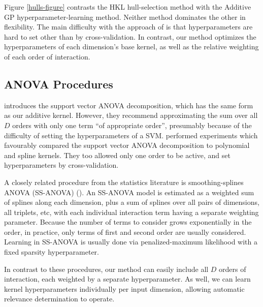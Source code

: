 Figure \ref{hulls-figure} contrasts the HKL hull-selection method with the Additive GP hyperparameter-learning method. Neither method dominates the other in flexibility.  The main difficulty with the approach of \cite{DBLP:journals/corr/abs-0909-0844} is that hyperparameters are hard to set other than by cross-validation.  In contrast, our method optimizes the hyperparameters of each dimension's base kernel, as well as the relative weighting of each order of interaction. 


\subsection{ANOVA Procedures}

\cite{vapnik1998statistical} introduces the support vector ANOVA decomposition, which has the same form as our additive kernel.  However, they recommend approximating the sum over all $D$ orders with only one term ``of appropriate order'', presumably because of the difficulty of setting the hyperparameters of a SVM. \cite{stitson1999support} performed experiments which favourably compared the support vector ANOVA decomposition to polynomial and spline kernels.  They too allowed only one order to be active, and set hyperparameters by cross-validation.
%

A closely related procedure from the statistics literature is smoothing-splines ANOVA (SS-ANOVA) (\cite{wahba1990spline}). An SS-ANOVA model is estimated as a weighted sum of splines along each dimension, plus a sum of splines over all pairs of dimensions, all triplets, etc, with each individual interaction term having a separate weighting parameter.  Because the number of terms to consider grows exponentially in the order, in practice, only terms of first and second order are usually considered.  Learning in SS-ANOVA is usually done via penalized-maximum likelihood with a fixed sparsity hyperparameter.

In contrast to these procedures, our method can easily include all $D$ orders of interaction, each weighted by a separate hyperparameter. As well, we can learn kernel hyperparameters individually per input dimension, allowing automatic relevance determination to operate.

